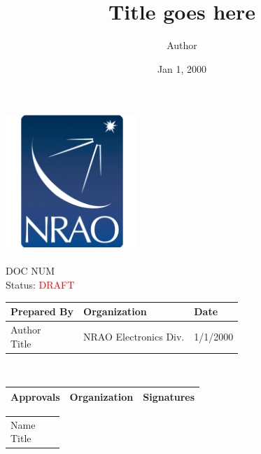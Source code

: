 \documentclass[titlepage]{article}
\title{Title goes here}
\author{Author
    }%
\date{Jan 1, 2000}
\def\docnum{DOC NUM}
\def\status{\textcolor{red}{DRAFT}}
\renewcommand{\arraystretch}{1.4}
\begin{document}
\setlength{\leftmargin}{1in}        %
\setlength{\rightmargin}{1in}       %
\setlength{\voffset}{-1.2in}        %
\setlength{\headheight}{3.5cm}      %
\setlength{\textheight}{591pt}      %
\setlength{\footskip}{60pt}         %

\thispagestyle{fancy}
\begin{center}
     \includegraphics[width=5cm]{images/NRAO Logo Badge.png} \\
     \vspace*{0.5cm}
     \textbf{\huge\thetitle} \\
     \vspace*{0.5cm}
     \large\docnum \\
     \Large Status: \status \\
     \vspace*{0.6cm} \large
     \begin{tabular}{|m{6.93cm}|m{4.5cm}|m{2cm}|} \hline
        \rowcolor{nraoblue}
        \textbf{Prepared By} & \textbf{Organization} & \textbf{Date} \\ \hline
        \makecell[l]{Author\\Title} & NRAO Electronics Div. & 1/1/2000 \\ 
        \hline
    \end{tabular} \\
    \vspace*{0.8cm}
    \begin{tabular}{|m{3cm}|m{3.5cm}|m{6.93cm}|} \hline
        \rowcolor{nraoblue}
        \textbf{Approvals} & \textbf{Organization} & \textbf{Signatures} \\ \hline
    \end{tabular}
    \renewcommand{\arraystretch}{2}
    \begin{tabular}{|w{l}{3cm}|m{3.5cm}|m{6.93cm}|} \hline
        \parbox{3cm}{\raggedright
        Name\\Title
}
\end{tabular}
\end{center}
\end{document}
